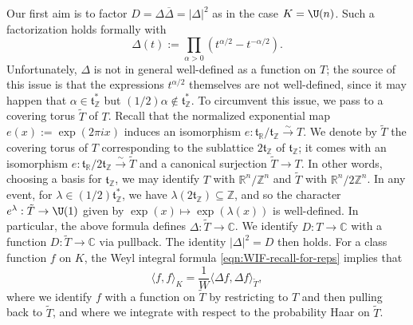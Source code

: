 \documentclass[reqno]{amsart} 
\begin{document}
Our first aim is to factor $D= \Delta \overline{\Delta } = |\Delta|^2$ as in the case $K = \U(n)$.  Such a factorization holds formally with
\begin{equation}\label{eqn:}
  \Delta(t) :=
  \prod_{\alpha > 0}
  (t^{\alpha/2} - t^{-\alpha/2}).
\end{equation}
Unfortunately, $\Delta$ is not in general well-defined as a function on $T$; the source of this issue is that the expressions $t^{\alpha/2}$ themselves are not well-defined, since it may happen that $\alpha \in \mathfrak{t}_{\mathbb{Z}}^*$ but $(1/2) \alpha \notin \mathfrak{t}_{\mathbb{Z}}^*$.  To circumvent this issue, we pass to a covering torus $\tilde{T}$ of $T$.  Recall that the normalized exponential map $e(x) := \exp(2 \pi i x)$ induces an isomorphism $e : \mathfrak{t}_{\mathbb{R}} / \mathfrak{t}_{\mathbb{Z}} \xrightarrow{\sim} T$.  We denote by $\tilde{T}$ the covering torus of $T$ corresponding to the sublattice $2 \mathfrak{t}_{\mathbb{Z}}$ of $\mathfrak{t}_{\mathbb{Z}}$; it comes with an isomorphism $e : \mathfrak{t}_{\mathbb{R}} / 2 \mathfrak{t}_{\mathbb{Z}} \xrightarrow{\sim} \tilde{T}$ and a canonical surjection $\tilde{T} \rightarrow T$.  In other words, choosing a basis for $\mathfrak{t}_{\mathbb{Z}}$, we may identify $T$ with $\mathbb{R}^n/\mathbb{Z}^n$ and $\tilde{T}$ with $\mathbb{R}^n/2 \mathbb{Z}^n$.  In any event, for $\lambda \in (1/2) \mathfrak{t}_{\mathbb{Z}}^*$, we have $\lambda(2 \mathfrak{t}_{\mathbb{Z}}) \subseteq \mathbb{Z}$, and so the character $e^{\lambda} : \tilde{T} \rightarrow \U(1)$ given by $\exp(x) \mapsto \exp(\lambda(x))$ is well-defined.  In particular, the above formula defines $\Delta : \tilde{T} \rightarrow \mathbb{C}$.  We identify $D : T \rightarrow \mathbb{C}$ with a function $D : \tilde{T} \rightarrow \mathbb{C}$ via pullback.  The identity $|\Delta|^2 = D$ then holds.  For a class function $f$ on $K$, the Weyl integral formula \eqref{eqn:WIF-recall-for-reps} implies that
\begin{equation}\label{eqn:}
  \langle f, f \rangle_K
  =
  \frac{1}{W}
  \langle \Delta f, \Delta f \rangle_{\tilde{T}},
\end{equation}
where we identify $f$ with a function on $\tilde{T}$ by restricting to $T$ and then pulling back to $\tilde{T}$, and where we integrate with respect to the probability Haar on $\tilde{T}$.
\end{document}
